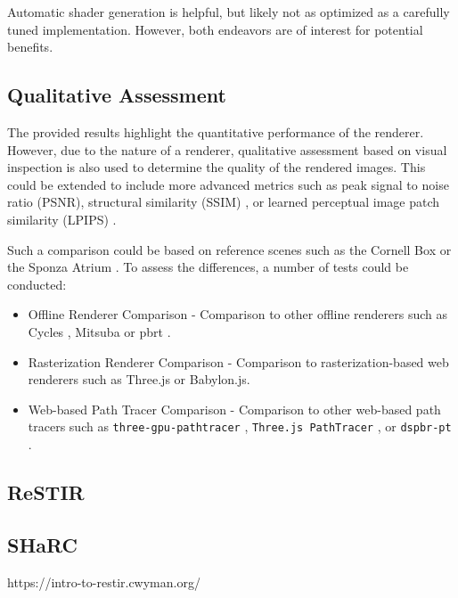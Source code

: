 Automatic shader generation is helpful, but likely not as optimized as a carefully tuned implementation. However, both endeavors are of interest for potential benefits.

\subsection*{Qualitative Assessment}

The provided results highlight the quantitative performance of the renderer. However, due to the nature of a renderer, qualitative assessment based on visual inspection is also used to determine the quality of the rendered images. This could be extended to include more advanced metrics such as peak signal to noise ratio (PSNR), structural similarity (SSIM) \cite{ssim}, or learned perceptual image patch similarity (LPIPS) \cite{lpips}.

Such a comparison could be based on reference scenes such as the Cornell Box \cite{goral1984modeling} or the Sponza Atrium \cite{dabrovic2002sponza}. To assess the differences, a number of tests could be conducted:

\begin{itemize}
    \item{Offline Renderer Comparison} - Comparison to other offline renderers such as Cycles \cite{cycles}, Mitsuba \cite{Jakob2020DrJit} or \gls{pbrt} \cite{Pharr_Physically_Based_Rendering_2023}.
    \item{Rasterization Renderer Comparison} - Comparison to rasterization-based web renderers such as \gls{Three.js} or \gls{Babylon.js}.
    \item{Web-based Path Tracer Comparison} - Comparison to other web-based path tracers such as \texttt{three-gpu-pathtracer} \cite{ThreeJsPathTracerJohnson}, \texttt{Three.js PathTracer} \cite{ThreeJsPathTracerLoftis}, or \texttt{dspbr-pt} \cite{PathTracerDassault}.
\end{itemize}


\subsection{ReSTIR}
\subsection{SHaRC}

https://intro-to-restir.cwyman.org/